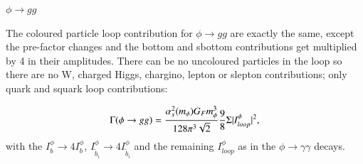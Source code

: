 \documentclass[final,3p,times,pdflatex]{elsarticle}
\begin{document}
\underline{$\phi \rightarrow gg$}

The coloured particle loop contribution for $\phi \rightarrow gg$ are exactly the same, except the pre-factor changes and the bottom and sbottom contributions get multiplied by 4 in their amplitudes. There can be no uncoloured particles in the loop so there are no W, charged Higgs, chargino, lepton or slepton contributions; only quark and squark loop contributions:

\begin{equation} \label{phigg}
\Gamma(\phi \rightarrow gg) = {\alpha_{s}^2(m_{\phi}) G_{F} m_{\phi}^3 \over 128 \pi^3 \sqrt{2}} {9 \over 8}\Sigma|I_{loop}^\phi|^2,
\end{equation}
with the $I_{b}^{\phi} \rightarrow 4 I_{b}^{\phi}$, $I_{\tilde{b}_i}^{\phi} \rightarrow 4 I_{\tilde{b}_i}^{\phi}$ and the remaining $I_{loop}^{\phi}$ as in the $\phi \rightarrow \gamma \gamma$ decays.
\end{document}
